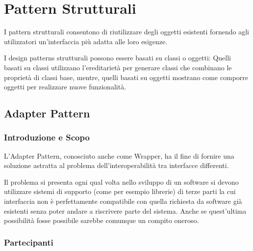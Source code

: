 \chapter{Pattern Strutturali}

I pattern strutturali consentono di riutilizzare degli oggetti 
esistenti fornendo agli utilizzatori un'interfaccia più adatta alle 
loro esigenze.

I design patterns strutturali possono essere basati su classi o oggetti:
Quelli basati su classi utilizzano l’ereditarietà per generare classi 
che combinano le proprietà di classi base, mentre, quelli basati su oggetti 
mostrano come comporre oggetti per realizzare nuove funzionalità.

  \section{Adapter Pattern}
  
    \subsection{Introduzione e Scopo}
    
    L'Adapter Pattern, conosciuto anche come Wrapper, ha il fine di fornire
    una soluzione astratta al problema dell'interoperabilità tra interfacce 
    differenti.
    
    Il problema si presenta ogni qual volta nello sviluppo di un software 
    si devono utilizzare sistemi di supporto (come per esempio librerie)
    di terze parti la cui interfaccia non è perfettamente compatibile con 
    quella richiesta da software già esistenti senza poter andare a 
    riscrivere parte del sistema. Anche se quest'ultima possibilità fosse
    possibile sarebbe comunque un compito oneroso.
    
    \subsection{Partecipanti}
    
